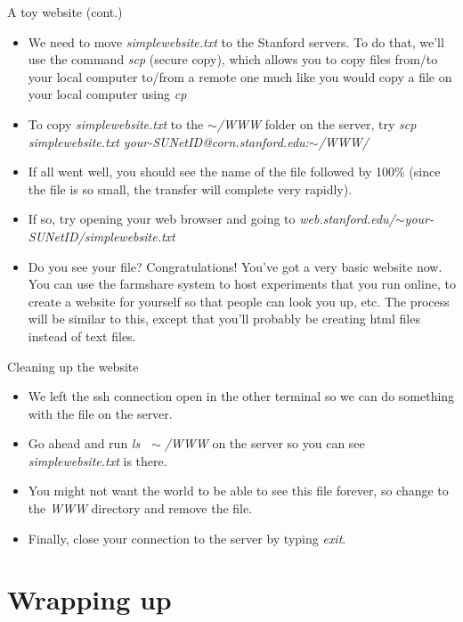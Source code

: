 \documentclass{beamer}
\begin{document}
\begin{frame}{A toy website (cont.)}
\begin{itemize}
    \item<1-> We need to move \emph{simplewebsite.txt} to the Stanford servers. To do that, we'll use the command \emph{scp} (secure copy), which allows you to copy files from/to your local computer to/from a remote one much like you would copy a file on your local computer using \emph{cp} 
    \item<2-> To copy \emph{simplewebsite.txt} to the \emph{$\sim$/WWW} folder on the server, try \emph{scp simplewebsite.txt your-SUNetID@corn.stanford.edu:$\sim$/WWW/} 
    \item<3-> If all went well, you should see the name of the file followed by 100\% (since the file is so small, the transfer will complete very rapidly). 
    \item<3-> If so, try opening your web browser and going to \emph{web.stanford.edu/$\sim$your-SUNetID/simplewebsite.txt} 
    \item<4-> Do you see your file? Congratulations! You've got a very basic website now. You can use the farmshare system to host experiments that you run online, to create a website for yourself so that people can look you up, etc. The process will be similar to this, except that you'll probably be creating html files instead of text files. 
\end{itemize}
\end{frame}

\begin{frame}{Cleaning up the website}
\begin{itemize}
    \item<1-> We left the ssh connection open in the other terminal so we can do something with the file on the server.
    \item<2-> Go ahead and run \emph{ls $\;\sim$/WWW} on the server so you can see \emph{simplewebsite.txt} is there.
    \item<3-> You might not want the world to be able to see this file forever, so change to the \emph{WWW} directory and remove the file.
    \item<4-> Finally, close your connection to the server by typing \emph{exit}.
\end{itemize}
\end{frame}

\section{Wrapping up}
\end{document}
